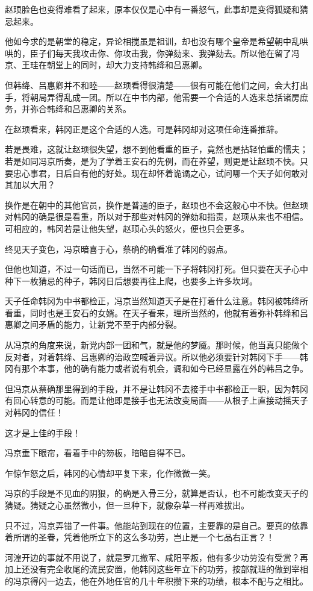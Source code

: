 赵顼脸色也变得难看了起来，原本仅仅是心中有一番怒气，此事却是变得狐疑和猜忌起来。

他如今求的是朝堂的稳定，异论相搅虽是祖训，却也没有哪个皇帝是希望朝中乱哄哄的，臣子们每天我攻击你、你攻击我，你弹劾来、我弹劾去。所以他在留了冯京、王珪在朝堂上的同时，却大力支持韩绛和吕惠卿。

但韩绛、吕惠卿并不和睦——赵顼看得很清楚——很有可能在他们之间，会大打出手，将朝局弄得乱成一团。所以在中书内部，他需要一个合适的人选来总括诸房庶务，并弥合韩绛和吕惠卿的关系。

在赵顼看来，韩冈正是这个合适的人选。可是韩冈却对这项任命连番推辞。

若是畏难，这就让赵顼很失望，想不到他看重的臣子，竟然也是拈轻怕重的懦夫；若是如同冯京所奏，是为了学着王安石的先例，而在养望，则更是让赵顼不快。只要忠心事君，日后自有他的好处。现在却怀着诡谲之心，试问哪一个天子如何敢对其加以大用？

换作是在朝中的其他官员，换作是普通的臣子，赵顼也不会这般心中不快。但赵顼对韩冈的确是很是看重，所以对于那些对韩冈的弹劾和指责，赵顼从来也不相信。可相应的，韩冈若是让他失望，赵顼心头的怒火，便也只会更多。

终见天子变色，冯京暗喜于心，蔡确的确看准了韩冈的弱点。

但他也知道，不过一句话而已，当然不可能一下子将韩冈打死。但只要在天子心中种下一枚猜忌的种子，韩冈日后想要再往上爬，也要多上许多坎坷。

天子任命韩冈为中书都检正，冯京当然知道天子是在打着什么注意。韩冈被韩绛所看重，同时也是王安石的女婿。在天子看来，理所当然的，他就有着弥补韩绛和吕惠卿之间矛盾的能力，让新党不至于内部分裂。

从冯京的角度来说，新党内部一团和气，就是他的梦魇。那时候，他当真只能做个反对者，对着韩绛、吕惠卿的治政空喊着异议。所以他必须要针对韩冈下手——韩冈有那个本事，他的确有能力或者说有机会，调和如今已经显露在外的韩吕之争。

但冯京从蔡确那里得到的手段，并不是让韩冈不去接手中书都检正一职，因为韩冈有回心转意的可能。而是让他即是接手也无法改变局面——从根子上直接动摇天子对韩冈的信任！

这才是上佳的手段！

冯京垂下眼帘，看着手中的笏板，暗暗自得不已。

乍惊乍怒之后，韩冈的心情却平复下来，化作微微一笑。

冯京的手段是不见血的阴狠，的确是入骨三分，就算是否认，也不可能改变天子的猜疑。猜疑之心虽然微小，但一旦种下，就像杂草一样再难拔出。

只不过，冯京弄错了一件事。他能站到现在的位置，主要靠的是自己。要真的依靠着所谓的圣眷，凭着他所立下的这么多功劳，岂止是一个七品右正言？！

河湟开边的事就不用说了，就是罗兀撤军、咸阳平叛，他有多少功劳没有受赏？再加上还没有完全收尾的流民安置，他韩冈这些年立下的功劳，按部就班的做到宰相的冯京得闪一边去，他在外地任官的几十年积攒下来的功绩，根本不配与之相比。

